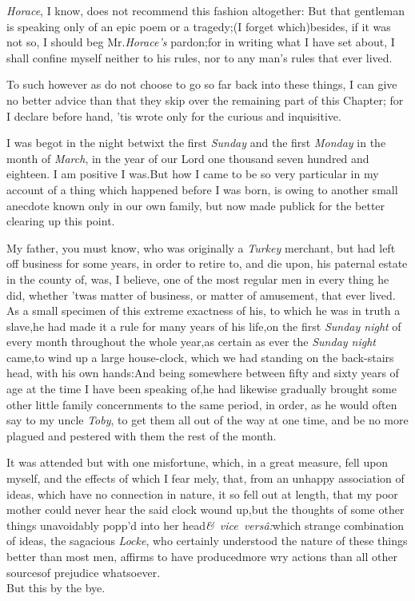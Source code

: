 \documentclass{article}
\begin{document}
\textit{Horace}, I know, does not recommend this fashion
altogether: But that gentleman is speaking only of an epic poem or
a tragedy;\tsk  (I forget which)\tsk besides, if it was not so, I
should beg Mr.\@ \textit{Horace’s} pardon;\tsk  for in writing
what I have set about, I shall confine myself neither to his rules,
nor to any man’s rules that ever lived.

To such however as do not choose to 
go so far back into these things, I can\break
give no better advice than that they\break
skip over the remaining part of this\break 
Chapter; for I declare before hand, ’tis
wrote only for the curious and inquisitive.

\noindent
{}\break
I was begot in the night betwixt the first \textit{Sunday} and the first
\textit{Monday} in the month of \textit{March}, in the year of our Lord one thousand
seven hundred and eighteen.\break
I am positive I was.\tsk  But how I came to be so very
particular in my account of a thing which happened before I was born, is owing to
another small anecdote known only in our own family, but now made publick for the
better clearing up this point.

My father, you must know, who was originally a \textit{Turkey}
merchant, but had left off business for some years, in order to
retire to, and die upon, his paternal estate in the county of\tsh, 
was, I believe, one of the most regular men in
every thing he did, whether ’twas matter of business, or
matter of amusement, that ever lived. As a small specimen of this
extreme exactness of his, to which he was in truth a slave,\tsk he had
made it a rule for many years of his life,\tsk  on the first
\textit{Sunday night} of every month throughout the whole
year,\tsk  as certain as ever the \textit{Sunday night}
came,\tsk  to wind up a large house-clock, which we had standing
on the back-stairs head, with his own hands:\tsk  And being
somewhere between fifty and sixty years of age at the time I
have been speaking of,\tsk  he had likewise gradually
brought some other little family concernments to the same period,
in order, as he would often say to my uncle \textit{Toby}, to get
them all out of the way at one time, and be no more plagued
and pestered with them the rest of the month.

It was attended but with one misfortune, which, in a great
measure, fell upon myself, and the effects of which I fear\break
{}
mely, that, from an unhappy association
of ideas, which have no connection in nature, it so fell out at
length, that my poor mother could never hear the said clock wound
up,\tsk  but the thoughts of some other things unavoidably
popp’d into her head\tsk  \hbox{{\small\itshape\egb\&} \textit{vice
versâ:}}\tsk  which strange combination of ideas, the
sagacious \textit{Locke}, who certainly understood the nature of
these things better than most men, affirms to have produced\break more
wry actions than all other sources\break of prejudice whatsoever.\\
\indent But this by the bye.\hfill{}
\end{document}
